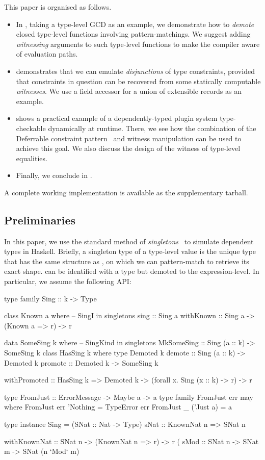 \documentclass[demotion-paper.tex]{subfiles}
\begin{document}
This paper is organised as follows.
\begin{itemize}
  \item In , taking a type-level GCD as an example, we demonstrate how to \emph{demote} closed type-level functions involving pattern-matchings.
  We suggest adding \emph{witnessing} arguments to such type-level functions to make the compiler aware of evaluation paths.
  \item {} demonstrates that we can emulate \emph{disjunctions} of type constraints, provided that constraints in question can be recovered from some statically computable \emph{witnesses}.
  We use a field accessor for a union of extensible records as an example.
  \item {} shows a practical example of a dependently-typed plugin system type-checkable dynamically at runtime.
  There, we see how the combination of the Deferrable constraint pattern~\cite{Kmett:2020ab} and witness manipulation can be used to achieve this goal.
  We also discuss the design of the witness of type-level equalities.
  \item Finally, we conclude in .
\end{itemize}

A complete working implementation is available as the supplementary tarball.

\subsection{Preliminaries}
In this paper, we use the standard method of \emph{singletons}~\cite{Eisenberg:2012} to simulate dependent types in Haskell.
Briefly, a singleton type  of a type-level value  is the unique type that has the same structure as , on which we can pattern-match to retrieve its exact shape.
 can be identified with a type  but demoted to the expression-level.
In particular, we assume the following API:

\begin{code}
type family Sing :: k -> Type

class Known a where -- SingI in singletons
  sing :: Sing a
withKnown :: Sing a -> (Known a => r) -> r

data SomeSing k where -- SingKind in singletons
  MkSomeSing :: Sing (a :: k) -> SomeSing k
class HasSing k where
  type Demoted k 
  demote :: Sing (a :: k) -> Demoted k
  promote :: Demoted k -> SomeSing k

withPromoted :: HasSing k
  => Demoted k
  -> (forall x. Sing (x :: k) -> r) -> r

type FromJust :: ErrorMessage -> Maybe a -> a
type family FromJust err may where 
  FromJust err 'Nothing = TypeError err
  FromJust _ ('Just a)  = a

type instance Sing = (SNat :: Nat -> Type)
sNat :: KnownNat n => SNat n

withKnownNat :: SNat n -> (KnownNat n => r) -> r
(%
sMod :: SNat n -> SNat m -> SNat (n `Mod` m)
\end{code}
\end{document}
